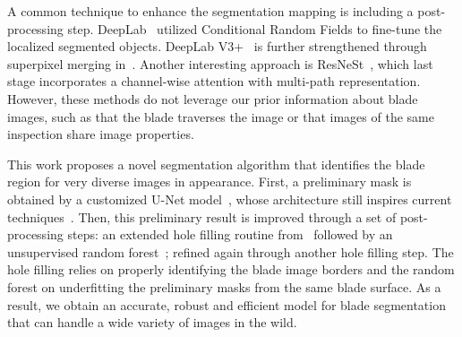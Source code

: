 A common technique to enhance the segmentation mapping is including a post-processing step. DeepLab~\cite{deeplab} utilized Conditional Random Fields to fine-tune the localized segmented objects. DeepLab V3+~\cite{deeplabv3+} is further strengthened through superpixel merging in~\cite{generic}. Another interesting approach is ResNeSt~\cite{resnest}, which last stage incorporates a channel-wise attention with multi-path representation. However, these methods do not leverage our prior information about blade images, such as that the blade traverses the image or that images of the same inspection share image properties.  

This work proposes a novel segmentation algorithm that identifies the blade region for very diverse images in appearance. First, a preliminary mask is obtained by a customized U-Net model~\cite{unet}, whose architecture still inspires current techniques~\cite{unetformer}. Then, this preliminary result is improved through a set of post-processing steps: an extended hole filling routine from~\cite{fill} followed by an unsupervised random forest~\cite{randomforest}; refined again through another hole filling step. The hole filling relies on properly identifying the blade image borders and the random forest on underfitting the preliminary masks from the same blade surface. As a result, we obtain an accurate, robust and efficient model for blade segmentation that can handle a wide variety of images in the wild.
